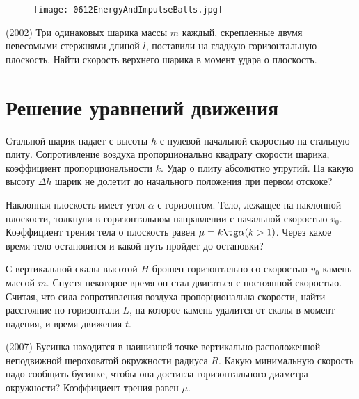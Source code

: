 \begin{wrapfigure}{r}{2.5cm}
\texttt{[image: 0612EnergyAndImpulseBalls.jpg]}
\end{wrapfigure}

\AddProb (2002) Три одинаковых шарика массы $m$ каждый, скрепленные двумя невесомыми стержнями длиной $l$, 
поставили на гладкую горизонтальную плоскость. Найти скорость верхнего шарика в момент удара о плоскость.


\section{Решение уравнений движения}

\AddProb Стальной шарик падает с высоты $h$ с нулевой начальной скоростью на стальную плиту. 
Сопротивление воздуха пропорционально квадрату скорости шарика, коэффициент пропорциональности $k$. 
Удар о плиту абсолютно упругий. На какую высоту $\Delta h$ шарик не долетит до начального положения при первом отскоке?

\AddProb Наклонная плоскость имеет угол $\alpha$ с горизонтом. Тело, лежащее на наклонной плоскости, 
толкнули в горизонтальном направлении с начальной скоростью $v_0$. Коэффициент трения тела о плоскость равен $\mu = k \tg \alpha (k>1)$. 
Через какое время тело остановится и какой путь пройдет до остановки?

\AddProb С вертикальной скалы высотой $H$ брошен горизонтально со скоростью $v_0$ камень массой $m$. 
Спустя некоторое время он стал двигаться с постоянной скоростью. 
Считая, что сила сопротивления воздуха пропорциональна скорости, найти расстояние по горизонтали $L$, 
на которое камень удалится от скалы в момент падения, и время движения $t$.

\AddProb (2007) Бусинка находится в наинизшей точке вертикально расположенной неподвижной шероховатой окружности радиуса $R$. 
Какую минимальную скорость надо сообщить бусинке, чтобы она достигла горизонтального диаметра окружности? Коэффициент трения равен $\mu$.